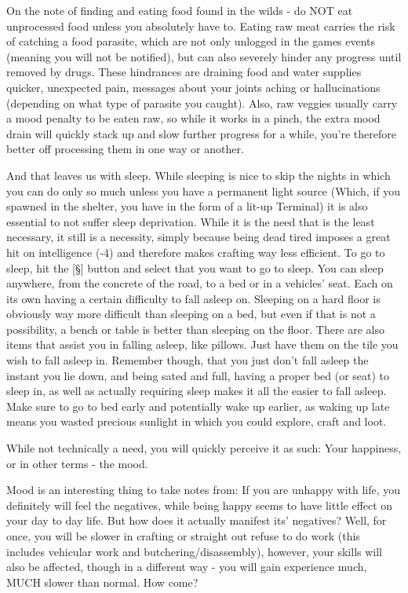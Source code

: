 \documentclass[11pt]{report}
\begin{document}
On the note of finding and eating food found in the wilds - do NOT eat unprocessed food unless you absolutely have to. Eating raw meat carries the risk of catching a food parasite, which are not only unlogged in the games events (meaning you will not be notified), but can also severely hinder any progress until removed by drugs. These hindrances are draining food and water supplies quicker, unexpected pain, messages about your joints aching or hallucinations (depending on what type of parasite you caught). Also, raw veggies usually carry a mood penalty to be eaten raw, so while it works in a pinch, the extra mood drain will quickly stack up and slow further progress for a while, you're therefore better off processing them in one way or another.

And that leaves us with sleep. While sleeping is nice to skip the nights in which you can do only so much unless you have a permanent light source (Which, if you spawned in the shelter, you have in the form of a lit-up Terminal) it is also essential to not suffer sleep deprivation. While it is the need that is the least necessary, it still is a necessity, simply because being dead tired imposes a great hit on intelligence (-4) and therefore makes crafting way less efficient. To go to sleep, hit the [\S] button and select that you want to go to sleep. You can sleep anywhere, from the concrete of the road, to a bed or in a vehicles' seat. Each on its own having a certain difficulty to fall asleep on. Sleeping on a hard floor is obviously way more difficult than sleeping on a bed, but even if that is not a possibility, a bench or table is better than sleeping on the floor. There are also items that assist you in falling asleep, like pillows. Just have them on the tile you wish to fall asleep in. Remember though, that you just don't fall asleep the instant you lie down, and being sated and full, having a proper bed (or seat) to sleep in, as well as actually requiring sleep makes it all the easier to fall asleep. Make sure to go to bed early and potentially wake up earlier, as waking up late means you wasted precious sunlight in which you could explore, craft and loot.

While not technically a need, you will quickly perceive it as such: Your happiness, or in other terms - the mood.

Mood is an interesting thing to take notes from: If you are unhappy with life, you definitely will feel the negatives, while being happy seems to have little effect on your day to day life. But how does it actually manifest its' negatives? Well, for once, you will be slower in crafting or straight out refuse to do work (this includes vehicular work and butchering/disassembly), however, your skills will also be affected, though in a different way - you will gain experience much, MUCH slower than normal. How come?
\end{document}
